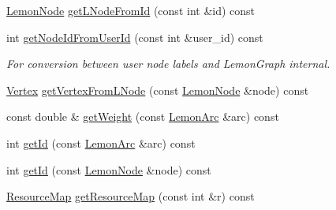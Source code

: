 \begin{DoxyCompactItemize}
\item 
\hyperlink{digraph_8h_a952c6b935f7521c3435dbd13b255246b}{Lemon\+Node} \hyperlink{classbidirectional_1_1DiGraph_a966eb000fda1f5dac268f8f4ae6b19cb}{get\+L\+Node\+From\+Id} (const int \&id) const
\item 
int \hyperlink{classbidirectional_1_1DiGraph_a9b6d435d6eac3751da5b2ee427826657}{get\+Node\+Id\+From\+User\+Id} (const int \&user\+\_\+id) const
\begin{DoxyCompactList}\small\item\em For conversion between user node labels and Lemon\+Graph internal. \end{DoxyCompactList}\item 
\hyperlink{structbidirectional_1_1Vertex}{Vertex} \hyperlink{classbidirectional_1_1DiGraph_aba1a01186d95c4a9ac73031ed1de5432}{get\+Vertex\+From\+L\+Node} (const \hyperlink{digraph_8h_a952c6b935f7521c3435dbd13b255246b}{Lemon\+Node} \&node) const
\item 
const double \& \hyperlink{classbidirectional_1_1DiGraph_aa2b4359a9ed9574384d38e37310601df}{get\+Weight} (const \hyperlink{digraph_8h_a0f10c67f03c054baec3e3bab6a92171e}{Lemon\+Arc} \&arc) const
\item 
int \hyperlink{classbidirectional_1_1DiGraph_a7b16dcef9b23770124b19a295f06178a}{get\+Id} (const \hyperlink{digraph_8h_a0f10c67f03c054baec3e3bab6a92171e}{Lemon\+Arc} \&arc) const
\item 
int \hyperlink{classbidirectional_1_1DiGraph_afb87bafec6ea1764bd19509f0b0ca4e9}{get\+Id} (const \hyperlink{digraph_8h_a952c6b935f7521c3435dbd13b255246b}{Lemon\+Node} \&node) const
\item 
\hyperlink{classbidirectional_1_1ResourceMap}{Resource\+Map} \hyperlink{classbidirectional_1_1DiGraph_a45a3d6b4164c0881cdad5ab23aa9eda8}{get\+Resource\+Map} (const int \&r) const
\end{DoxyCompactItemize}

